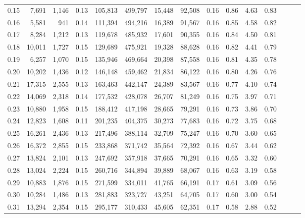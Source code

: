 \begin{tabular}{rrrrrrrrrrrrrrr}
0.15 &   7,691 &  1,146 &  0.13 &  105,813 &  499,797 &   15,448 &   92,508 &  0.16 &  0.86 &  4.63 &      0.83 \\
0.16 &   5,581 &    941 &  0.14 &  111,394 &  494,216 &   16,389 &   91,567 &  0.16 &  0.85 &  4.58 &      0.82 \\
0.17 &   8,284 &  1,212 &  0.13 &  119,678 &  485,932 &   17,601 &   90,355 &  0.16 &  0.84 &  4.50 &      0.81 \\
0.18 &  10,011 &  1,727 &  0.15 &  129,689 &  475,921 &   19,328 &   88,628 &  0.16 &  0.82 &  4.41 &      0.79 \\
0.19 &   6,257 &  1,070 &  0.15 &  135,946 &  469,664 &   20,398 &   87,558 &  0.16 &  0.81 &  4.35 &      0.78 \\
0.20 &  10,202 &  1,436 &  0.12 &  146,148 &  459,462 &   21,834 &   86,122 &  0.16 &  0.80 &  4.26 &      0.76 \\
0.21 &  17,315 &  2,555 &  0.13 &  163,463 &  442,147 &   24,389 &   83,567 &  0.16 &  0.77 &  4.10 &      0.74 \\
0.22 &  14,069 &  2,318 &  0.14 &  177,532 &  428,078 &   26,707 &   81,249 &  0.16 &  0.75 &  3.97 &      0.71 \\
0.23 &  10,880 &  1,958 &  0.15 &  188,412 &  417,198 &   28,665 &   79,291 &  0.16 &  0.73 &  3.86 &      0.70 \\
0.24 &  12,823 &  1,608 &  0.11 &  201,235 &  404,375 &   30,273 &   77,683 &  0.16 &  0.72 &  3.75 &      0.68 \\
0.25 &  16,261 &  2,436 &  0.13 &  217,496 &  388,114 &   32,709 &   75,247 &  0.16 &  0.70 &  3.60 &      0.65 \\
0.26 &  16,372 &  2,855 &  0.15 &  233,868 &  371,742 &   35,564 &   72,392 &  0.16 &  0.67 &  3.44 &      0.62 \\
0.27 &  13,824 &  2,101 &  0.13 &  247,692 &  357,918 &   37,665 &   70,291 &  0.16 &  0.65 &  3.32 &      0.60 \\
0.28 &  13,024 &  2,224 &  0.15 &  260,716 &  344,894 &   39,889 &   68,067 &  0.16 &  0.63 &  3.19 &      0.58 \\
0.29 &  10,883 &  1,876 &  0.15 &  271,599 &  334,011 &   41,765 &   66,191 &  0.17 &  0.61 &  3.09 &      0.56 \\
0.30 &  10,284 &  1,486 &  0.13 &  281,883 &  323,727 &   43,251 &   64,705 &  0.17 &  0.60 &  3.00 &      0.54 \\
0.31 &  13,294 &  2,354 &  0.15 &  295,177 &  310,433 &   45,605 &   62,351 &  0.17 &  0.58 &  2.88 &      0.52 \\

\end{tabular}
